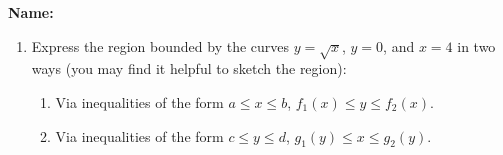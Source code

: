 \documentclass[12pt]{article}
\begin{document}
{\bf \Large Name:}
\thispagestyle{fancy}

\bigskip

\begin{enumerate}

 \item Express the region bounded by the curves $y=\sqrt{x}$, $y=0$, and $x=4$ in two ways (you may find it helpful to sketch the region):
\begin{enumerate}
 \item Via inequalities of the form $a\leq x\leq b$, $f_1(x)\leq y\leq f_2(x)$.

\vspace{4in}

 \item Via inequalities of the form $c\leq y\leq d$, $g_1(y)\leq x\leq g_2(y)$.
\end{enumerate}


\end{enumerate}
\end{document}
